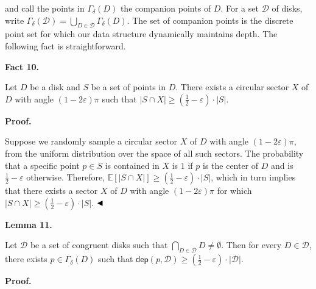 and call the points in $\varGamma_{\delta}(D)$ the companion points of $D$. For a set $\mathcal{D}$ of disks, write $\varGamma_{\delta}(\mathcal{D})=\bigcup_{D\in\mathcal{D}}\varGamma_{\delta}(D)$. The set of companion points is the discrete point set for which our data structure dynamically maintains depth. The following fact is straightforward.
\par
\par
\par\medskip\noindent\textbf{Fact 10.}\par
Let $D$ be a disk and $S$ be a set of points in $D$. There exists a circular sector $X$ of $D$ with angle $(1-2\varepsilon)\pi$ such that $|S\cap X|\geq(\frac{1}{2}-\varepsilon)\cdot|S|$.
\par
\par
\par
\par\medskip\noindent\textbf{Proof.}\par
Suppose we randomly sample a circular sector $X$ of $D$ with angle $(1-2\varepsilon)\pi$, from the uniform distribution over the space of all such sectors. The probability that a specific point $p\in S$ is contained in $X$ is $1$ if $p$ is the center of $D$ and is $\frac{1}{2}-\varepsilon$ otherwise. Therefore, $\mathbb{E}[|S\cap X|]\geq(\frac{1}{2}-\varepsilon)\cdot|S|$, which in turn implies that there exists a sector $X$ of $D$ with angle $(1-2\varepsilon)\pi$ for which $|S\cap X|\geq(\frac{1}{2}-\varepsilon)\cdot|S|$. $\hfill\blacktriangleleft$
\par
\par
\par\medskip\noindent\textbf{Lemma 11.}\par
Let $\mathcal{D}$ be a set of congruent disks such that $\bigcap_{D\in\mathcal{D}}D\neq\emptyset$. Then for every $D\in\mathcal{D}$, there exists $p\in\varGamma_{\delta}(D)$ such that $\mathsf{dep}(p,\mathcal{D})\geq\left(\frac{1}{2}-\varepsilon\right)\cdot|%
\mathcal{D}|$.
\par
\par
\par
\par\medskip\noindent\textbf{Proof.}\par
